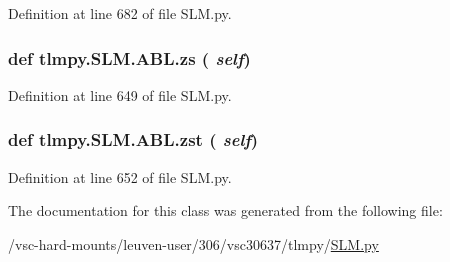 Definition at line 682 of file SLM.py.\hypertarget{classtlmpy_1_1SLM_1_1ABL_a0913ecb90c46cbfc457c307600af6a7b}{
\subsubsection[{zs}]{\setlength{\rightskip}{0pt plus 5cm}def tlmpy.SLM.ABL.zs ( {\em self})}}
\label{classtlmpy_1_1SLM_1_1ABL_a0913ecb90c46cbfc457c307600af6a7b}


Definition at line 649 of file SLM.py.\hypertarget{classtlmpy_1_1SLM_1_1ABL_a24af9a19364b2232df4705846d3ac7aa}{
\subsubsection[{zst}]{\setlength{\rightskip}{0pt plus 5cm}def tlmpy.SLM.ABL.zst ( {\em self})}}
\label{classtlmpy_1_1SLM_1_1ABL_a24af9a19364b2232df4705846d3ac7aa}


Definition at line 652 of file SLM.py.

The documentation for this class was generated from the following file:\begin{DoxyCompactItemize}
\item 
/vsc-\/hard-\/mounts/leuven-\/user/306/vsc30637/tlmpy/\hyperlink{SLM_8py}{SLM.py}\end{DoxyCompactItemize}
